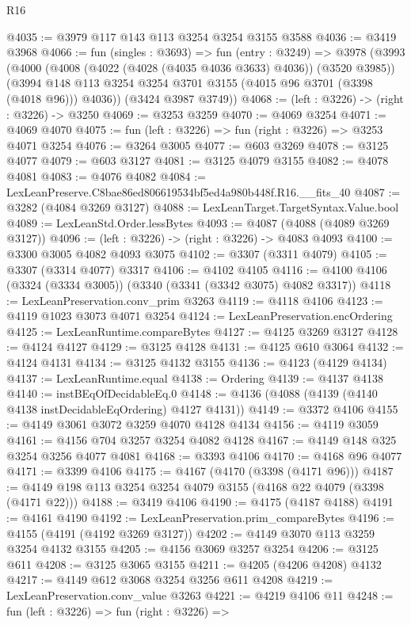 \begin{lexlean}{R16}
\begin{coremodule}
@4035 := @3979 @117 @143 @113 @3254 @3254 @3155 @3588
@4036 := @3419 @3968
@4066 := fun (singles : @3693) =>
  fun (entry : @3249) =>
  @3978
    (@3993
      (@4000
        (@4008 (@4022 (@4028 (@4035 @4036 @3633) @4036)) (@3520 @3985))
        (@3994 @148 @113 @3254 @3254 @3701 @3155 (@4015 @96 @3701 (@3398 (@4018 @96))) @4036))
      (@3424 @3987 @3749))
@4068 := (left : @3226) -> (right : @3226) -> @3250
@4069 := @3253 @3259
@4070 := @4069 @3254
@4071 := @4069 @4070
@4075 := fun (left : @3226) => fun (right : @3226) => @3253 @4071 @3254
@4076 := @3264 @3005
@4077 := @603 @3269
@4078 := @3125 @4077
@4079 := @603 @3127
@4081 := @3125 @4079 @3155
@4082 := @4078 @4081
@4083 := @4076 @4082
@4084 := LexLeanPreserve.C8bae86ed806619534bf5ed4a980b448f.R16.__fits_40
@4087 := @3282 (@4084 @3269 @3127)
@4088 := LexLeanTarget.TargetSyntax.Value.bool
@4089 := LexLeanStd.Order.lessBytes
@4093 := @4087 (@4088 (@4089 @3269 @3127))
@4096 := (left : @3226) -> (right : @3226) -> @4083 @4093
@4100 := @3300 @3005 @4082 @4093 @3075
@4102 := @3307 (@3311 @4079)
@4105 := @3307 (@3314 @4077) @3317
@4106 := @4102 @4105
@4116 := @4100 @4106 (@3324 (@3334 @3005)) (@3340 (@3341 (@3342 @3075) @4082 @3317))
@4118 := LexLeanPreservation.conv_prim @3263
@4119 := @4118 @4106
@4123 := @4119 @1023 @3073 @4071 @3254
@4124 := LexLeanPreservation.encOrdering
@4125 := LexLeanRuntime.compareBytes
@4127 := @4125 @3269 @3127
@4128 := @4124 @4127
@4129 := @3125 @4128
@4131 := @4125 @610 @3064
@4132 := @4124 @4131
@4134 := @3125 @4132 @3155
@4136 := @4123 (@4129 @4134)
@4137 := LexLeanRuntime.equal
@4138 := Ordering
@4139 := @4137 @4138
@4140 := instBEqOfDecidableEq.{0}
@4148 := @4136 (@4088 (@4139 (@4140 @4138 instDecidableEqOrdering) @4127 @4131))
@4149 := @3372 @4106
@4155 := @4149 @3061 @3072 @3259 @4070 @4128 @4134
@4156 := @4119 @3059
@4161 := @4156 @704 @3257 @3254 @4082 @4128
@4167 := @4149 @148 @325 @3254 @3256 @4077 @4081
@4168 := @3393 @4106
@4170 := @4168 @96 @4077
@4171 := @3399 @4106
@4175 := @4167 (@4170 (@3398 (@4171 @96)))
@4187 := @4149 @198 @113 @3254 @3254 @4079 @3155 (@4168 @22 @4079 (@3398 (@4171 @22)))
@4188 := @3419 @4106
@4190 := @4175 (@4187 @4188)
@4191 := @4161 @4190
@4192 := LexLeanPreservation.prim_compareBytes
@4196 := @4155 (@4191 (@4192 @3269 @3127))
@4202 := @4149 @3070 @113 @3259 @3254 @4132 @3155
@4205 := @4156 @3069 @3257 @3254
@4206 := @3125 @611
@4208 := @3125 @3065 @3155
@4211 := @4205 (@4206 @4208) @4132
@4217 := @4149 @612 @3068 @3254 @3256 @611 @4208
@4219 := LexLeanPreservation.conv_value @3263
@4221 := @4219 @4106 @11
@4248 := fun (left : @3226) =>
  fun (right : @3226) =>

\end{coremodule}
\end{lexlean}
